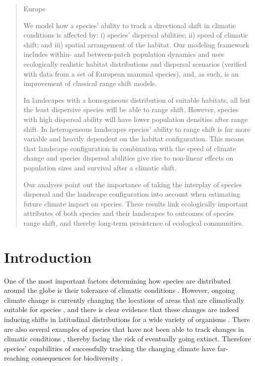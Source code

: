 \documentclass[12pt,pdftex]{article}
\begin{document}
\begin{spacing}{2}
\begin{abstract}
Europe 

  We model how a species' ability to track a directional shift in climatic conditions is affected by: i) species' dispersal abilities; ii) speed of climatic shift; and iii) spatial arrangement of the habitat. Our modeling framework includes within- and between-patch population dynamics and uses ecologically realistic habitat distributions and dispersal scenarios (verified with data from a set of  European mammal species), and, as such, is an improvement of classical range shift models. 

  In landscapes with a homogeneous distribution of suitable habitats, all but the least dispersive species will be able to range shift. However, species with high dispersal ability will have lower population densities after range shift. In heterogeneous landscapes species' ability to range shift is far more variable and heavily dependent on the habitat configuration. This means that landscape configuration in combination with the speed of climate change and species dispersal abilities give rise to non-linear effects on population sizes and survival after a climatic shift.

  Our analyses point out the importance of taking the interplay of species dispersal and the landscape configuration into account when estimating future climate impact on species. These results link ecologically important attributes of both species and their landscapes to outcomes of species range shift, and thereby long-term persistence of ecological communities. 
\end{abstract}
\clearpage

\section*{Introduction}
One of the most important factors determining how species are distributed around the globe is their tolerance of climatic conditions \citep{Thomas2010}. However, ongoing climate change is currently changing the locations of areas that are climatically suitable for species \citep{Loarie2009}, and there is clear evidence that these changes are indeed inducing shifts in latitudinal distributions for a wide variety of organisms \citep{Parmesan2003, Chen2011,Lenoir2015}. There are also several examples of species that have not been able to track changes in climatic conditions \citep{Maclean2011}, thereby facing the risk of eventually going extinct. Therefore species' capabilities of successfully tracking the changing climate have far-reaching consequences for biodiversity \citep{Thuiller2005a}. 


\end{spacing}
\end{document}
